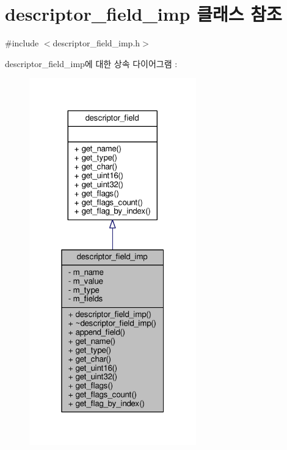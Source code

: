 \hypertarget{classavdecc__lib_1_1descriptor__field__imp}{}\section{descriptor\+\_\+field\+\_\+imp 클래스 참조}
\label{classavdecc__lib_1_1descriptor__field__imp}


{\ttfamily \#include $<$descriptor\+\_\+field\+\_\+imp.\+h$>$}



descriptor\+\_\+field\+\_\+imp에 대한 상속 다이어그램 \+: 
\nopagebreak
\begin{figure}[H]
\begin{center}
\leavevmode
\includegraphics[width=205pt]{classavdecc__lib_1_1descriptor__field__imp__inherit__graph}
\end{center}
\end{figure}


